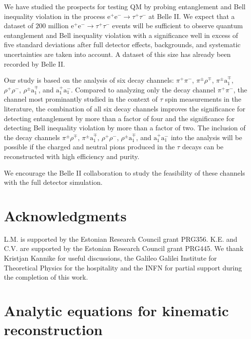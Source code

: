 \documentclass[a4paper,12pt,twocolumn]{article}
\numberwithin{equation}{section} %
\newcommand{\Pam}{\ensuremath{\textrm{a}_{1}^{-}}\xspace}
\newcommand{\Pamp}{\ensuremath{\textrm{a}_{1}^{\mp}}\xspace}
\newcommand{\Pap}{\ensuremath{\textrm{a}_{1}^{+}}\xspace}
\newcommand{\Pem}{\ensuremath{\textrm{e}^{-}}\xspace}
\newcommand{\Pep}{\ensuremath{\textrm{e}^{+}}\xspace}
\newcommand{\Pgpm}{\ensuremath{\pi^{-}}\xspace}
\newcommand{\Pgpp}{\ensuremath{\pi^{+}}\xspace}
\newcommand{\Pgppm}{\ensuremath{\pi^{\pm}}\xspace}
\newcommand{\Pgrm}{\ensuremath{\rho^{-}}\xspace}
\newcommand{\Pgrmp}{\ensuremath{\rho^{\mp}}\xspace}
\newcommand{\Pgrp}{\ensuremath{\rho^{+}}\xspace}
\newcommand{\Pgrpm}{\ensuremath{\rho^{\pm}}\xspace}
\newcommand{\Pgt}{\ensuremath{\tau}\xspace}
\newcommand{\Pgtm}{\ensuremath{\tau^{-}}\xspace}
\newcommand{\Pgtp}{\ensuremath{\tau^{+}}\xspace}
\begin{document}
We have studied the prospects for testing QM by probing entanglement and Bell inequality violation in the process $\Pep\Pem \to \Pgtp\Pgtm$ at Belle II. We expect that a dataset of $200$ million $\Pep\Pem \to \Pgtp\Pgtm$ events will be sufficient to observe quantum entanglement and Bell inequality violation with a significance well in excess of five standard deviations after full detector effects, backgrounds, and systematic uncertainties are taken into account. A dataset of this size has already been recorded by Belle II.

Our study is based on the analysis of six decay channels: $\Pgpp\Pgpm$, $\Pgppm\Pgrmp$, $\Pgppm\Pamp$, $\Pgrp\Pgrm$, $\Pgrpm\Pamp$, and $\Pap\Pam$. Compared to analyzing only the decay channel $\Pgpp\Pgpm$, the channel most prominantly studied in the context of $\Pgt$ spin measurements in the literature, the combination of all six decay channels improves the significance for detecting entanglement by more than a factor of four and the significance for detecting Bell inequality violation by more than a factor of two. The inclusion of the decay channels $\Pgppm\Pgrmp$, $\Pgppm\Pamp$, $\Pgrp\Pgrm$, $\Pgrpm\Pamp$, and $\Pap\Pam$ into the analysis will be possible if the charged and neutral pions produced in the $\Pgt$ decays can be reconstructed with high efficiency and purity.

We encourage the Belle II collaboration to study the feasibility of these channels with the full detector simulation.


\section*{Acknowledgments}
L.M. is supported by the Estonian Research Council grant PRG356. K.E. and C.V. are supported by the Estonian Research Council grant PRG445. We thank Kristjan Kannike for useful discussions, the Galileo Galilei Institute for Theoretical Physics for the hospitality and the INFN for partial support during the completion of this work.

\newpage
\appendix

\section{Analytic equations for kinematic reconstruction}
\label{sec:appendixA}
\end{document}
